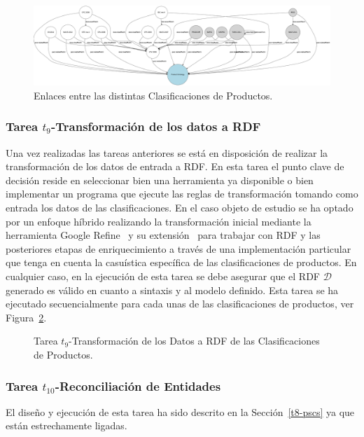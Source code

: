 \begin{figure}[!htb]
\centering
	\includegraphics[width=20cm,angle=90]{./images/phd/pscs}
\caption{Enlaces entre las distintas Clasificaciones de Productos.}
\label{fig:linked-pscs}
\end{figure}

\subsubsection{Tarea $t_9$-Transformación de los datos a RDF }
Una vez realizadas las tareas anteriores se está en disposición de realizar la transformación 
de los datos de entrada a \gls{RDF}. En esta tarea el punto clave de decisión reside en seleccionar bien 
una herramienta ya disponible o bien implementar un programa que ejecute las reglas de transformación 
tomando como entrada los datos de las clasificaciones. En el caso objeto de estudio se ha optado 
por un enfoque híbrido realizando la transformación inicial mediante la herramienta Google Refine~\cite{google-refine} y su extensión~\cite{grefine} 
para trabajar con RDF y las posteriores etapas de enriquecimiento a través de una implementación particular que tenga en cuenta 
la casuística específica de las clasificaciones de productos. En cualquier caso, en la ejecución de esta 
tarea se debe asegurar que el \dataset RDF $\mathcal{D}$ generado es válido en cuanto a sintaxis y al modelo definido. Esta tarea 
se ha ejecutado secuencialmente para cada unas de las clasificaciones de productos, ver Figura~\ref{fig:t9-pscs}.

\begin{figure}[!htb]
\centering
\caption{Tarea $t_9$-Transformación de los Datos a RDF de las Clasificaciones de Productos.}
\label{fig:t9-pscs}
\end{figure}

\subsubsection{Tarea $t_{10}$-Reconciliación de Entidades}
El diseño y ejecución de esta tarea ha sido descrito en la Sección~\ref{t8-pscs} ya que están 
estrechamente ligadas.

